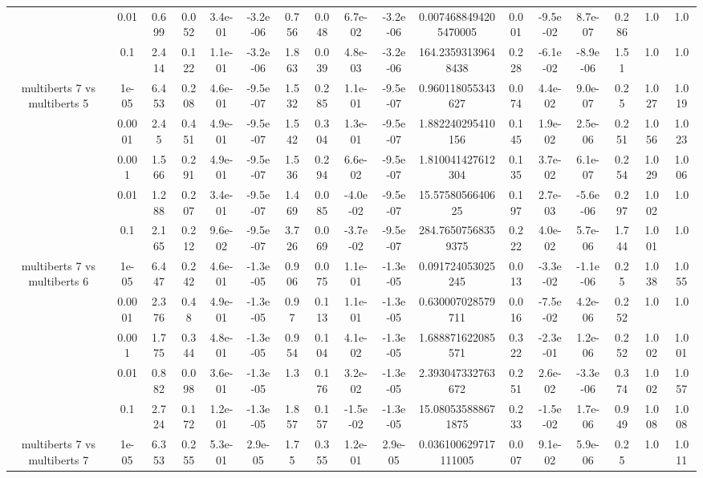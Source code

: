\begin{tabular}{|c|c|c|c|c|c|c|c|c|c|c|c|c|c|c|c|c|}
 & 0.01 & 0.699 & 0.052 & 3.4e-01 & -3.2e-06 & 0.756 & 0.048 & 6.7e-02 & -3.2e-06 & 0.0074688494205470005 & 0.001 & -9.5e-02 & 8.7e-07 & 0.286 & 1.0 & 1.0 \\
 & 0.1 & 2.414 & 0.122 & 1.1e-01 & -3.2e-06 & 1.863 & 0.039 & 4.8e-03 & -3.2e-06 & 164.23593139648438 & 0.228 & -6.1e-02 & -8.9e-06 & 1.51 & 1.0 & 1.0 \\
\hline
\multirow{5}{*}{multiberts 7 vs multiberts 5} & 1e-05 & 6.453 & 0.208 & 4.6e-01 & -9.5e-07 & 1.532 & 0.285 & 1.1e-01 & -9.5e-07 & 0.960118055343627 & 0.074 & 4.4e-02 & 9.0e-07 & 0.25 & 1.027 & 1.019 \\
 & 0.0001 & 2.45 & 0.451 & 4.9e-01 & -9.5e-07 & 1.542 & 0.304 & 1.3e-01 & -9.5e-07 & 1.882240295410156 & 0.145 & 1.9e-02 & 2.5e-06 & 0.251 & 1.056 & 1.023 \\
 & 0.001 & 1.566 & 0.291 & 4.9e-01 & -9.5e-07 & 1.536 & 0.294 & 6.6e-02 & -9.5e-07 & 1.810041427612304 & 0.135 & 3.7e-02 & 6.1e-07 & 0.254 & 1.029 & 1.006 \\
 & 0.01 & 1.288 & 0.207 & 3.4e-01 & -9.5e-07 & 1.469 & 0.085 & -4.0e-02 & -9.5e-07 & 15.5758056640625 & 0.197 & 2.7e-03 & -5.6e-06 & 0.297 & 1.002 & 1.0 \\
 & 0.1 & 2.165 & 0.212 & 9.6e-02 & -9.5e-07 & 3.726 & 0.069 & -3.7e-02 & -9.5e-07 & 284.76507568359375 & 0.222 & 4.0e-02 & 5.7e-06 & 1.744 & 1.001 & 1.0 \\
\hline
\multirow{5}{*}{multiberts 7 vs multiberts 6} & 1e-05 & 6.447 & 0.242 & 4.6e-01 & -1.3e-05 & 0.906 & 0.075 & 1.1e-01 & -1.3e-05 & 0.091724053025245 & 0.013 & -3.3e-02 & -1.1e-06 & 0.25 & 1.038 & 1.055 \\
 & 0.0001 & 2.376 & 0.48 & 4.9e-01 & -1.3e-05 & 0.97 & 0.113 & 1.1e-01 & -1.3e-05 & 0.630007028579711 & 0.016 & -7.5e-02 & 4.2e-06 & 0.252 & 1.0 & 1.0 \\
 & 0.001 & 1.775 & 0.344 & 4.8e-01 & -1.3e-05 & 0.954 & 0.104 & 4.1e-02 & -1.3e-05 & 1.688871622085571 & 0.322 & -2.3e-01 & 1.2e-06 & 0.252 & 1.002 & 1.001 \\
 & 0.01 & 0.882 & 0.098 & 3.6e-01 & -1.3e-05 & 1.3 & 0.176 & 3.2e-02 & -1.3e-05 & 2.393047332763672 & 0.251 & 2.6e-02 & -3.3e-06 & 0.374 & 1.002 & 1.057 \\
 & 0.1 & 2.724 & 0.172 & 1.2e-01 & -1.3e-05 & 1.857 & 0.157 & -1.5e-02 & -1.3e-05 & 15.080535888671875 & 0.233 & -1.5e-02 & 1.7e-06 & 0.949 & 1.008 & 1.008 \\
\hline
\multirow{5}{*}{multiberts 7 vs multiberts 7} & 1e-05 & 6.353 & 0.255 & 5.3e-01 & 2.9e-05 & 1.75 & 0.355 & 1.2e-01 & 2.9e-05 & 0.036100629717111005 & 0.007 & 9.1e-02 & 5.9e-06 & 0.25 & 1.0 & 1.011 \\

\end{tabular}
